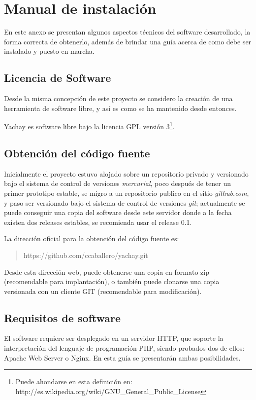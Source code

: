 \chapter{Manual de instalación}
En este anexo se presentan algunos aspectos técnicos del software desarrollado,
la forma correcta de obtenerlo, además de brindar una guía acerca de como debe
ser instalado y puesto en marcha.

\section{Licencia de Software}
Desde la misma concepción de este proyecto se considero la creación de una
herramienta de software libre, y así es como se ha mantenido desde entonces.

Yachay es software libre bajo la licencia GPL versión 3\footnote{Puede ahondarse
en esta definición en:
http://es.wikipedia.org/wiki/GNU\_General\_Public\_License}.

\section{Obtención del código fuente}
Inicialmente el proyecto estuvo alojado sobre un repositorio privado y
versionado bajo el sistema de control de versiones \emph{mercurial}, poco
después de tener un primer prototipo estable, se migro a un repositorio
publico en el sitio \emph{github.com}, y paso ser versionado bajo el sistema de
control de versiones \emph{git}; actualmente se puede conseguir una copia del
software desde este servidor donde a la fecha existen dos releases estables, se
recomienda usar el release 0.1.

La dirección oficial para la obtención del código fuente es:
\begin{quote}
https://github.com/ccaballero/yachay.git
\end{quote}

Desde esta dirección web, puede obtenerse una copia en formato zip
(recomendable para implantación), o también puede clonarse una copia versionada
con un cliente GIT (recomendable para modificación).

\section{Requisitos de software}
El software requiere ser desplegado en un servidor HTTP, que soporte la
interpretación del lenguaje de programación PHP, siendo probados dos de
ellos: Apache Web Server o Nginx. En esta guía se presentarán ambas
posibilidades.

